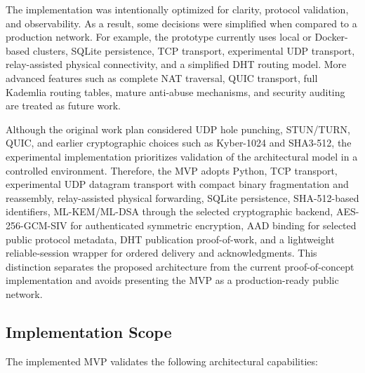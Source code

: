 \documentclass[12pt,a4paper]{article}
\begin{document}
The implementation was intentionally optimized for clarity, protocol validation, and observability. As a result, some decisions were simplified when compared to a production network. For example, the prototype currently uses local or Docker-based clusters, SQLite persistence, TCP transport, experimental UDP transport, relay-assisted physical connectivity, and a simplified DHT routing model. More advanced features such as complete NAT traversal, QUIC transport, full Kademlia routing tables, mature anti-abuse mechanisms, and security auditing are treated as future work.

Although the original work plan considered UDP hole punching, STUN/TURN, QUIC, and earlier cryptographic choices such as Kyber-1024 and SHA3-512, the experimental implementation prioritizes validation of the architectural model in a controlled environment. Therefore, the MVP adopts Python, TCP transport, experimental UDP datagram transport with compact binary fragmentation and reassembly, relay-assisted physical forwarding, SQLite persistence, SHA-512-based identifiers, ML-KEM/ML-DSA through the selected cryptographic backend, AES-256-GCM-SIV for authenticated symmetric encryption, AAD binding for selected public protocol metadata, DHT publication proof-of-work, and a lightweight reliable-session wrapper for ordered delivery and acknowledgments. This distinction separates the proposed architecture from the current proof-of-concept implementation and avoids presenting the MVP as a production-ready public network.

\subsection{Implementation Scope}
\label{sec:implementation-scope}

The implemented MVP validates the following architectural capabilities:
\end{document}
